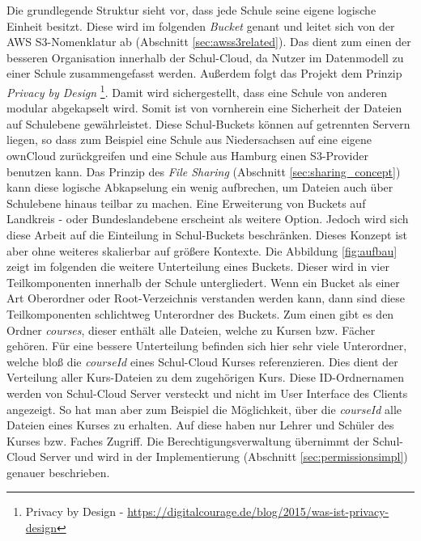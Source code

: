 Die grundlegende Struktur sieht vor, dass jede Schule seine eigene logische Einheit besitzt. Diese wird im folgenden \textit{Bucket} genant und leitet sich von der AWS S3-Nomenklatur ab (Abschnitt \ref{sec:awss3related}). Das dient zum einen der besseren Organisation innerhalb der Schul-Cloud, da Nutzer im Datenmodell zu einer Schule zusammengefasst werden. Außerdem folgt das Projekt dem Prinzip \textit{Privacy by Design} \footnote{Privacy by Design - \url{https://digitalcourage.de/blog/2015/was-ist-privacy-design} }. Damit wird sichergestellt, dass eine Schule von anderen modular abgekapselt wird. Somit ist von vornherein  eine Sicherheit der Dateien auf Schulebene gewährleistet. Diese Schul-Buckets können auf getrennten Servern liegen, so dass zum Beispiel eine Schule aus Niedersachsen auf eine eigene ownCloud zurückgreifen und eine Schule aus Hamburg einen S3-Provider benutzen kann. Das Prinzip des \textit{File Sharing} (Abschnitt \ref{sec:sharing_concept}) kann diese logische Abkapselung ein wenig aufbrechen, um Dateien auch über Schulebene hinaus teilbar zu machen. Eine Erweiterung von Buckets auf Landkreis - oder Bundeslandebene erscheint als weitere Option. Jedoch wird sich diese Arbeit auf die Einteilung in Schul-Buckets beschränken. Dieses Konzept ist aber ohne weiteres skalierbar auf größere Kontexte.  Die Abbildung \ref{fig:aufbau} zeigt im folgenden die weitere Unterteilung eines Buckets. Dieser wird in vier Teilkomponenten innerhalb der Schule  untergliedert. Wenn ein Bucket als einer Art Oberordner oder Root-Verzeichnis verstanden werden kann, dann sind diese Teilkomponenten schlichtweg Unterordner des Buckets. Zum einen gibt es den Ordner \textit{courses}, dieser enthält alle Dateien, welche zu Kursen bzw. Fächer gehören. Für eine bessere Unterteilung befinden sich hier sehr viele Unterordner, welche bloß die \textit{courseId} eines Schul-Cloud Kurses referenzieren. Dies dient der Verteilung aller Kurs-Dateien zu dem zugehörigen Kurs. Diese ID-Ordnernamen werden von Schul-Cloud Server versteckt und nicht im User Interface des  Clients angezeigt. So hat man aber zum Beispiel die Möglichkeit, über die \textit{courseId} alle Dateien eines Kurses zu erhalten. Auf diese haben nur Lehrer und Schüler des Kurses bzw. Faches Zugriff. Die Berechtigungsverwaltung übernimmt der Schul-Cloud Server und wird in der Implementierung (Abschnitt \ref{sec:permissionsimpl}) genauer beschrieben. \\

